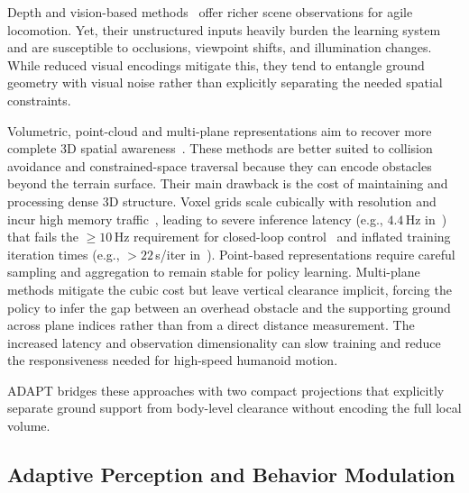\documentclass[letterpaper, 10 pt, conference]{ieeeconf/ieeeconf}
\DeclareRobustCommand{\RevisionAdd}[1]{{\color{red}#1}}
\begin{document}
Depth and vision-based methods~\cite{zhuang2024humanoidRobot,Li_2024_MOVE,zhuang2024humanoid,Yu_2025_START,Castillo_2025_LearningTerrainAwareBipedalLocomotion,Sun_2025_DPL,Wang_2025_LocoMamba,zhu2026hiking} offer richer scene observations for agile locomotion. Yet, their unstructured inputs heavily burden the learning system and are susceptible to occlusions, viewpoint shifts, and illumination changes. While reduced visual encodings mitigate this, they tend to entangle ground geometry with visual noise rather than explicitly separating the needed spatial constraints.


Volumetric, point-cloud and multi-plane representations aim to recover more complete 3D spatial awareness~\cite{Multi-Layer_ElevationMap_2025,Ben_2025_Gallant,Niijima_2025_Real-timeMulti-PlaneSegmentation,Wang_2025_Omni-Perception,Xue_2026_Collision-FreeHumanoidTraversal}. These methods are better suited to collision avoidance and constrained-space traversal because they can encode obstacles beyond the terrain surface. Their main drawback is the cost of maintaining and processing dense 3D structure. Voxel grids scale cubically with resolution and incur high memory traffic~\cite{2020arXiv200716100T}, leading to severe inference latency (e.g., $4.4$\,Hz in~\cite{2018arXiv181205784L}) that fails the $\ge 10$\,Hz requirement for closed-loop control~\cite{2022arXiv220108117M} and inflated training iteration times (e.g., $>22$\,s/iter in~\cite{Ben_2025_Gallant}). Point-based representations require careful sampling and aggregation to remain stable for policy learning. Multi-plane methods mitigate the cubic cost but leave vertical clearance implicit, forcing the policy to infer the gap between an overhead obstacle and the supporting ground across plane indices rather than from a direct distance measurement. The increased latency and observation dimensionality can slow training and reduce the responsiveness needed for high-speed humanoid motion.

\RevisionAdd{ADAPT bridges these approaches with two compact projections that explicitly separate ground support from body-level clearance without encoding the full local volume}.

\subsection{Adaptive Perception and Behavior Modulation}
\end{document}
